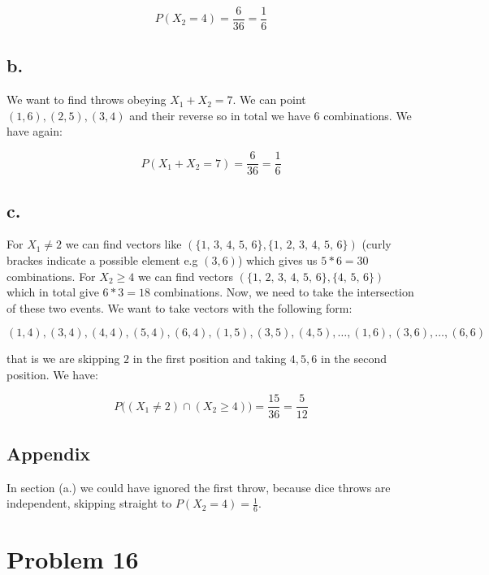 \documentclass{article}
\begin{document}
\begin{equation*}
    P(X_2 = 4) = \frac{6}{36} = \frac{1}{6}
\end{equation*}

\subsection*{b.}
We want to find throws obeying \(X_1 + X_2 = 7\). We can point \((1, 6), (2, 5), (3, 4)\) and their reverse so in total
we have \(6\) combinations. We have again:

\begin{equation*}
    P(X_1 + X_2 = 7) = \frac{6}{36} = \frac{1}{6}
\end{equation*}

\subsection*{c.}
For \(X_1 \neq 2\) we can find vectors like \((\mbox{\{1, 3, 4, 5, 6\}}, \mbox{\{1, 2, 3, 4, 5, 6\}})\) (curly brackes indicate a possible element e.g \((3, 6)\))
which gives us \(5 * 6 = 30\) combinations. For \(X_2 \geq 4\) we can find vectors \((\mbox{\{1, 2, 3, 4, 5, 6\}}, \mbox{\{4, 5, 6\}})\) which in total
give \(6 * 3 = 18\) combinations. Now, we need to take the intersection of these two events. We want to take vectors with the following form:

\begin{equation*}
    (1, 4), (3, 4), (4, 4), (5, 4), (6, 4), (1, 5), (3, 5), (4, 5), \dots , (1, 6), (3, 6), \dots, (6, 6)
\end{equation*}

that is we are skipping \(2\) in the first position and taking \(4, 5, 6\) in the second position. We have:

\begin{equation*}
    P\Big( (X_1 \neq 2) \cap (X_2 \geq 4) \Big) = \frac{15}{36} = \frac{5}{12}
\end{equation*}


\subsection*{Appendix}
In section (a.) we could have ignored the first throw, because dice throws are independent, skipping straight to
\(P(X_2 = 4) = \frac{1}{6}\).

\section*{Problem 16}
\end{document}
